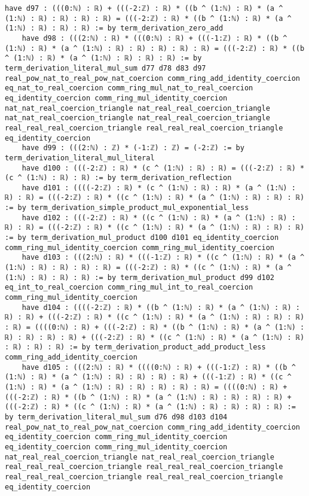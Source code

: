 \documentclass{article}
\begin{document}
\begin{tcolorbox}[colback=white!10, width=\linewidth]
\begin{lstlisting}[language=Lean4]
    have d97 : (((0:ℕ) : ℝ) + (((-2:ℤ) : ℝ) * ((b ^ (1:ℕ) : ℝ) * (a ^ (1:ℕ) : ℝ) : ℝ) : ℝ) : ℝ) = (((-2:ℤ) : ℝ) * ((b ^ (1:ℕ) : ℝ) * (a ^ (1:ℕ) : ℝ) : ℝ) : ℝ) := by term_derivation_zero_add
    have d98 : (((2:ℕ) : ℝ) * (((0:ℕ) : ℝ) + (((-1:ℤ) : ℝ) * ((b ^ (1:ℕ) : ℝ) * (a ^ (1:ℕ) : ℝ) : ℝ) : ℝ) : ℝ) : ℝ) = (((-2:ℤ) : ℝ) * ((b ^ (1:ℕ) : ℝ) * (a ^ (1:ℕ) : ℝ) : ℝ) : ℝ) := by term_derivation_literal_mul_sum d77 d78 d83 d97 real_pow_nat_to_real_pow_nat_coercion comm_ring_add_identity_coercion eq_nat_to_real_coercion comm_ring_mul_nat_to_real_coercion eq_identity_coercion comm_ring_mul_identity_coercion nat_nat_real_coercion_triangle nat_real_real_coercion_triangle nat_nat_real_coercion_triangle nat_real_real_coercion_triangle real_real_real_coercion_triangle real_real_real_coercion_triangle eq_identity_coercion
    have d99 : (((2:ℕ) : ℤ) * (-1:ℤ) : ℤ) = (-2:ℤ) := by term_derivation_literal_mul_literal
    have d100 : (((-2:ℤ) : ℝ) * (c ^ (1:ℕ) : ℝ) : ℝ) = (((-2:ℤ) : ℝ) * (c ^ (1:ℕ) : ℝ) : ℝ) := by term_derivation_reflection
    have d101 : ((((-2:ℤ) : ℝ) * (c ^ (1:ℕ) : ℝ) : ℝ) * (a ^ (1:ℕ) : ℝ) : ℝ) = (((-2:ℤ) : ℝ) * ((c ^ (1:ℕ) : ℝ) * (a ^ (1:ℕ) : ℝ) : ℝ) : ℝ) := by term_derivation_simple_product_mul_exponential_less
    have d102 : (((-2:ℤ) : ℝ) * ((c ^ (1:ℕ) : ℝ) * (a ^ (1:ℕ) : ℝ) : ℝ) : ℝ) = (((-2:ℤ) : ℝ) * ((c ^ (1:ℕ) : ℝ) * (a ^ (1:ℕ) : ℝ) : ℝ) : ℝ) := by term_derivation_mul_product d100 d101 eq_identity_coercion comm_ring_mul_identity_coercion comm_ring_mul_identity_coercion
    have d103 : (((2:ℕ) : ℝ) * (((-1:ℤ) : ℝ) * ((c ^ (1:ℕ) : ℝ) * (a ^ (1:ℕ) : ℝ) : ℝ) : ℝ) : ℝ) = (((-2:ℤ) : ℝ) * ((c ^ (1:ℕ) : ℝ) * (a ^ (1:ℕ) : ℝ) : ℝ) : ℝ) := by term_derivation_mul_product d99 d102 eq_int_to_real_coercion comm_ring_mul_int_to_real_coercion comm_ring_mul_identity_coercion
    have d104 : ((((-2:ℤ) : ℝ) * ((b ^ (1:ℕ) : ℝ) * (a ^ (1:ℕ) : ℝ) : ℝ) : ℝ) + (((-2:ℤ) : ℝ) * ((c ^ (1:ℕ) : ℝ) * (a ^ (1:ℕ) : ℝ) : ℝ) : ℝ) : ℝ) = ((((0:ℕ) : ℝ) + (((-2:ℤ) : ℝ) * ((b ^ (1:ℕ) : ℝ) * (a ^ (1:ℕ) : ℝ) : ℝ) : ℝ) : ℝ) + (((-2:ℤ) : ℝ) * ((c ^ (1:ℕ) : ℝ) * (a ^ (1:ℕ) : ℝ) : ℝ) : ℝ) : ℝ) := by term_derivation_product_add_product_less comm_ring_add_identity_coercion
    have d105 : (((2:ℕ) : ℝ) * ((((0:ℕ) : ℝ) + (((-1:ℤ) : ℝ) * ((b ^ (1:ℕ) : ℝ) * (a ^ (1:ℕ) : ℝ) : ℝ) : ℝ) : ℝ) + (((-1:ℤ) : ℝ) * ((c ^ (1:ℕ) : ℝ) * (a ^ (1:ℕ) : ℝ) : ℝ) : ℝ) : ℝ) : ℝ) = ((((0:ℕ) : ℝ) + (((-2:ℤ) : ℝ) * ((b ^ (1:ℕ) : ℝ) * (a ^ (1:ℕ) : ℝ) : ℝ) : ℝ) : ℝ) + (((-2:ℤ) : ℝ) * ((c ^ (1:ℕ) : ℝ) * (a ^ (1:ℕ) : ℝ) : ℝ) : ℝ) : ℝ) := by term_derivation_literal_mul_sum d76 d98 d103 d104 real_pow_nat_to_real_pow_nat_coercion comm_ring_add_identity_coercion eq_identity_coercion comm_ring_mul_identity_coercion eq_identity_coercion comm_ring_mul_identity_coercion nat_real_real_coercion_triangle nat_real_real_coercion_triangle real_real_real_coercion_triangle real_real_real_coercion_triangle real_real_real_coercion_triangle real_real_real_coercion_triangle eq_identity_coercion

\end{lstlisting}
\end{tcolorbox}
\end{document}
